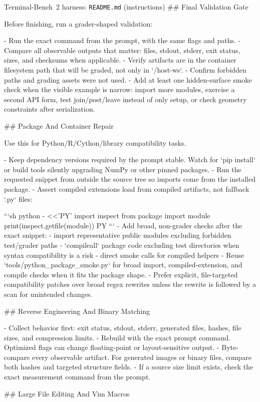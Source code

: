 \begin{promptbox}{Terminal-Bench~2 harness: \texttt{README.md} (instructions)}
## Final Validation Gate

Before finishing, run a grader-shaped validation:

- Run the exact command from the prompt, with the same flags and paths.
- Compare all observable outputs that matter: files, stdout, stderr, exit status, sizes, and checksums when applicable.
- Verify artifacts are in the container filesystem path that will be graded, not only in `/host-ws`.
- Confirm forbidden paths and grading assets were not used.
- Add at least one hidden-surface smoke check when the visible example is narrow: import more modules, exercise a second API form, test join/post/leave instead of only setup, or check geometry constraints after serialization.

## Package And Container Repair

Use this for Python/R/Cython/library compatibility tasks.

- Keep dependency versions required by the prompt stable. Watch for `pip install` or build tools silently upgrading NumPy or other pinned packages.
- Run the requested snippet from outside the source tree so imports come from the installed package.
- Assert compiled extensions load from compiled artifacts, not fallback `.py` files:

```sh
python - <<'PY'
import inspect
from package import module
print(inspect.getfile(module))
PY
```
- Add broad, non-grader checks after the exact snippet:
  - import representative public modules excluding forbidden test/grader paths
  - `compileall` package code excluding test directories when syntax compatibility is a risk
  - direct smoke calls for compiled helpers
- Reuse `tools/python_package_smoke.py` for broad import, compiled-extension, and compile checks when it fits the package shape.
- Prefer explicit, file-targeted compatibility patches over broad regex rewrites unless the rewrite is followed by a scan for unintended changes.

## Reverse Engineering And Binary Matching

- Collect behavior first: exit status, stdout, stderr, generated files, hashes, file sizes, and compression limits.
- Rebuild with the exact prompt command. Optimized flags can change floating-point or layout-sensitive output.
- Byte-compare every observable artifact. For generated images or binary files, compare both hashes and targeted structure fields.
- If a source size limit exists, check the exact measurement command from the prompt.

## Large File Editing And Vim Macros


\end{promptbox}
